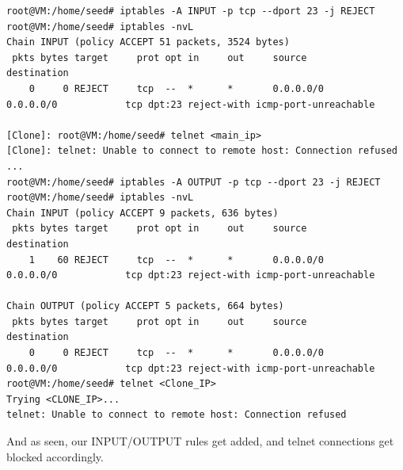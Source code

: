 \documentclass{article}
\begin{document}
\begin{verbatim}
root@VM:/home/seed# iptables -A INPUT -p tcp --dport 23 -j REJECT
root@VM:/home/seed# iptables -nvL
Chain INPUT (policy ACCEPT 51 packets, 3524 bytes)
 pkts bytes target     prot opt in     out     source               destination
    0     0 REJECT     tcp  --  *      *       0.0.0.0/0            0.0.0.0/0            tcp dpt:23 reject-with icmp-port-unreachable

[Clone]: root@VM:/home/seed# telnet <main_ip> 
[Clone]: telnet: Unable to connect to remote host: Connection refused
... 
root@VM:/home/seed# iptables -A OUTPUT -p tcp --dport 23 -j REJECT
root@VM:/home/seed# iptables -nvL
Chain INPUT (policy ACCEPT 9 packets, 636 bytes)
 pkts bytes target     prot opt in     out     source               destination
    1    60 REJECT     tcp  --  *      *       0.0.0.0/0            0.0.0.0/0            tcp dpt:23 reject-with icmp-port-unreachable

Chain OUTPUT (policy ACCEPT 5 packets, 664 bytes)
 pkts bytes target     prot opt in     out     source               destination
    0     0 REJECT     tcp  --  *      *       0.0.0.0/0            0.0.0.0/0            tcp dpt:23 reject-with icmp-port-unreachable
root@VM:/home/seed# telnet <Clone_IP>
Trying <CLONE_IP>...
telnet: Unable to connect to remote host: Connection refused
\end{verbatim}
And as seen, our INPUT/OUTPUT rules get added, and telnet connections get blocked
accordingly.\\
\end{document}
